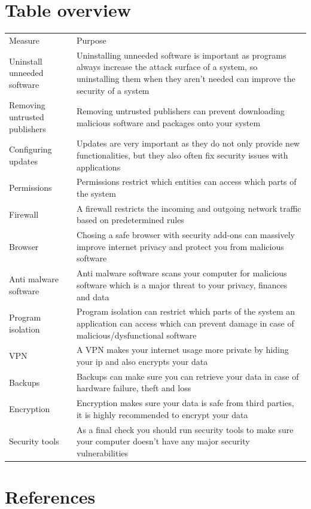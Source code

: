 \documentclass[a4paper,10pt]{article}
\begin{document}
\section{Table overview}
\begin{center}
\begin{tabularx}{\textwidth}{l|X}

Measure & Purpose\\
Uninstall unneeded software & Uninstalling unneeded software is important as programs always increase the attack surface of a system, so uninstalling them when they aren't needed can improve the security of a system\\
\hline
Removing untrusted publishers & Removing untrusted publishers can prevent downloading malicious software and packages onto your system\\
\hline
Configuring updates & Updates are very important as they do not only provide new functionalities, but they also often fix security issues with applications\\
\hline
Permissions & Permissions restrict which entities can access which parts of the system\\
\hline
Firewall & A firewall restricts the incoming and outgoing network traffic based on predetermined rules\\
\hline
Browser & Chosing a safe browser with security add-ons can massively improve internet privacy and protect you from malicious software\\
\hline
Anti malware software & Anti malware software scans your computer for malicious software which is a major threat to your privacy, finances and data\\
\hline
Program isolation & Program isolation can restrict which parts of the system an application can access which can prevent damage in case of malicious/dysfunctional software\\
\hline
VPN & A VPN makes your internet usage more private by hiding your ip and also encrypts your data\\
\hline
Backups & Backups can make sure you can retrieve your data in case of hardware failure, theft and loss\\
\hline
Encryption & Encryption makes sure your data is safe from third parties, it is highly recommended to encrypt your data\\
\hline
Security tools & As a final check you should run security tools to make sure your computer doesn't have any major security vulnerabilities\\
\end{tabularx}
\end{center}


\newpage
\section{References}



\newpage
\end{document}

